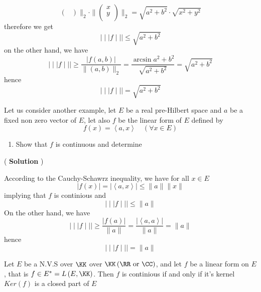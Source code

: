 \begin{example}
\begin{enumerate}[(1)]
\begin{enumerate}[(a)]
\[\begin{pmatrix}
	\end{pmatrix}
	\| _{2} 
	\cdot 
	\| 
	\begin{pmatrix}
		x \\
		y \\
	\end{pmatrix}
	\| _{2} = 
	\sqrt{a ^2 + b ^2 }  
	\cdot \sqrt{ x ^2  + y ^2 } 
	\]
	therefore we get 
	\[
	\mid \mid \mid  f \mid \mid \mid  \leq 
	\sqrt{a ^2  + b ^2 } 
	\]
	on the other hand, we have 
	\[
	\mid \mid \mid  f \mid \mid \mid  
	\geq  \frac{\left| f(a,b)  \right|}{\| (a,b)  \| _{2}} 
	= 
\frac{\arcsin{a ^2  + b ^2 }}{\sqrt{a ^2 + b^2 } } = 
\sqrt{a ^2  + b^2 } 
	\]
	hence 
	\[
	\mid \mid \mid  f \mid \mid \mid  = 
	\sqrt{a ^2  + b^2 } 
	\]
\end{enumerate}
\end{enumerate}
\end{example}
Let us consider another example, 
let $E $ be a real pre-Hilbert space and 
$a $ be a fixed non zero vector of $E $, let 
also $f$ be the linear form of $E $ defined by  
\[
f (x)  = \left\langle 
	a,x
\right\rangle  
\quad \left( 
	\forall  x \in E
\right)
\]
\begin{enumerate}[(1)]
\item 
Show that $f $ is continuous and determine  
\end{enumerate}
\begin{center}
	(
	\textbf{Solution }
	)
\end{center}
According to the Cauchy-Schawrz inequality, 
we have for all $x \in E$ 
\[
\left| f(x)  \right| = 
\left| \left\langle 
	a,x
\right\rangle  \right| 
\leq 
\| a \|  \| x \| 
\]
implying that $f$ is continious and 
\[
\mid \mid \mid  f \mid \mid \mid  
\leq \| a \| 
\]
On the other hand, we have 
\[
\mid \mid \mid  f \mid \mid \mid  
\geq 
\frac{\left| f(a)  \right|}{\| a \| } = 
\frac{\left| \left\langle a,a \right\rangle  \right|}{\| a \| } = 
\| a \| 
\]
hence 
\[
\mid \mid \mid  f \mid \mid \mid  = 
\| a \| 
\]
\begin{theorem}[]
Let $E $ be a N.V.S over $\KK$ over 
$\KK \left( \RR  \text{ or } \CC  \right) $, and let $f $ be a linear 
form on $E $ , that is 
$f \in E^{*} = L \left( E,\KK \right) $. Then $f $ is continious if and only if 
it's kernel $Ker(f)$ is a closed part of $E$ 
\end{theorem}
